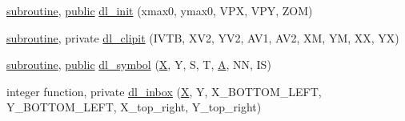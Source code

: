 \begin{DoxyCompactItemize}
\hyperlink{M__stopwatch_83_8txt_acfbcff50169d691ff02d4a123ed70482}{subroutine}, \hyperlink{M__stopwatch_83_8txt_a2f74811300c361e53b430611a7d1769f}{public} \hyperlink{namespacem__pixel__slices_a4ac8bc6e1f869e60a675611420fee0f7}{dl\+\_\+init} (xmax0, ymax0, V\+PX, V\+PY, Z\+OM)
\item 
\hyperlink{M__stopwatch_83_8txt_acfbcff50169d691ff02d4a123ed70482}{subroutine}, private \hyperlink{namespacem__pixel__slices_af0a3aeaa17e192568cb6a69a3b3eeab6}{dl\+\_\+clipit} (I\+V\+TB, X\+V2, Y\+V2, A\+V1, A\+V2, XM, YM, XX, YX)
\item 
\hyperlink{M__stopwatch_83_8txt_acfbcff50169d691ff02d4a123ed70482}{subroutine}, \hyperlink{M__stopwatch_83_8txt_a2f74811300c361e53b430611a7d1769f}{public} \hyperlink{namespacem__pixel__slices_a2a40fc08575b18772b520c7b5b81a91e}{dl\+\_\+symbol} (\hyperlink{intro__blas1_83_8txt_ac8596739bc875e90fe6e2ecf98e87906}{X}, Y, S, T, \hyperlink{ufpp__overview_81_8txt_a8341271e5f4e3003f6eb1c9547fc9d1a}{A}, NN, IS)
\item 
integer function, private \hyperlink{namespacem__pixel__slices_aa0de53a25754eab8fff1732aa2f93eba}{dl\+\_\+inbox} (\hyperlink{intro__blas1_83_8txt_ac8596739bc875e90fe6e2ecf98e87906}{X}, Y, X\+\_\+\+B\+O\+T\+T\+O\+M\+\_\+\+L\+E\+FT, Y\+\_\+\+B\+O\+T\+T\+O\+M\+\_\+\+L\+E\+FT, X\+\_\+top\+\_\+right, Y\+\_\+top\+\_\+right)
\end{DoxyCompactItemize}
